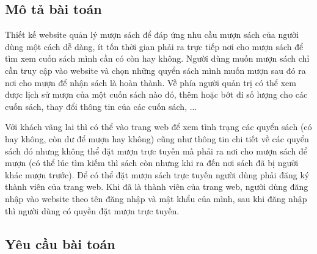 {}
\setcounter{section}{2}
\setcounter{subsection}{0}


\subsection{Mô tả bài toán}
Thiết kế website quản lý mượn sách để đáp ứng nhu cầu mượn sách của người dùng một cách dễ dàng, ít tốn thời gian phải ra trực tiếp nơi cho mượn sách để tìm xem cuốn sách mình cần có còn hay không. Người dùng muốn mượn sách chỉ cần truy cập vào website và chọn những quyển sách mình muốn mượn sau đó ra nơi cho mượn để nhận sách là hoàn thành. Về phía người quản trị có thể xem được lịch sử mượn của một cuốn sách nào đó, thêm hoặc bớt đi số lượng cho các cuốn sách, thay đổi thông tin của các cuốn sách, ...
\par
Với khách vãng lai thì có thể vào trang web để xem tình trạng các quyển sách (có hay không, còn dư để mượn hay không) cũng như thông tin chi tiết về các quyển sách đó nhưng không thể đặt mượn trực tuyến mà phải ra nơi cho mượn sách để mượn (có thể lúc tìm kiếm thì sách còn nhưng khi ra đến nơi sách đã bị người khác mượn trước). Để có thể đặt mượn sách trực tuyến người dùng phải đăng ký thành viên của trang web. Khi đã là thành viên của trang web, người dùng đăng nhập vào website theo tên đăng nhập và mật khẩu của mình, sau khi đăng nhập thì người dùng có quyền đặt mượn trực tuyến.


\subsection{Yêu cầu bài toán}

